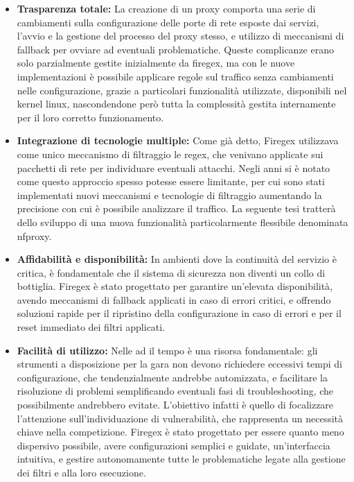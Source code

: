 \begin{itemize}
    \setlength{\itemsep}{1pt}
    \setlength{\parskip}{1pt}
    \item \textbf{Trasparenza totale:} La creazione di un proxy comporta una serie di cambiamenti sulla configurazione delle porte di rete esposte dai servizi, l'avvio e la gestione del processo del proxy stesso, e utilizzo di meccanismi di fallback per ovviare ad eventuali problematiche. Queste complicanze erano solo parzialmente gestite inizialmente da firegex, ma con le nuove implementazioni è possibile applicare regole sul traffico senza cambiamenti nelle configurazione, grazie a particolari funzionalità utilizzate, disponibili nel kernel linux, nascondendone però tutta la complessità gestita internamente per il loro corretto funzionamento.
    \item \textbf{Integrazione di tecnologie multiple:} Come già detto, Firegex utilizzava come unico meccanismo di filtraggio le \gls{regex}, che venivano applicate sui pacchetti di rete per individuare eventuali attacchi. Negli anni si è notato come questo approccio spesso potesse essere limitante, per cui sono stati implementati nuovi meccanismi e tecnologie di filtraggio aumentando la precisione con cui è possibile analizzare il traffico. La seguente tesi tratterà dello sviluppo di una nuova funzionalità particolarmente flessibile denominata \gls{nfproxy}.
    \item \textbf{Affidabilità e disponibilità:} In ambienti dove la continuità del servizio è critica, è fondamentale che il sistema di sicurezza non diventi un collo di bottiglia. Firegex è stato progettato per garantire un’elevata disponibilità, avendo meccanismi di fallback applicati in caso di errori critici, e offrendo soluzioni rapide per il ripristino della configurazione in caso di errori e per il reset immediato dei filtri applicati.
    \item \textbf{Facilità di utilizzo:} Nelle \gls{ad} il tempo è una risorsa fondamentale: gli strumenti a disposizione per la gara non devono richiedere eccessivi tempi di configurazione, che tendenzialmente andrebbe automizzata, e facilitare la risoluzione di problemi semplificando eventuali fasi di troubleshooting, che possibilmente andrebbero evitate. L'obiettivo infatti è quello di focalizzare l'attenzione sull'individuazione di vulnerabilità, che rappresenta un necessità chiave nella competizione. Firegex è stato progettato per essere quanto meno dispersivo possibile, avere configurazioni semplici e guidate, un'interfaccia intuitiva, e gestire autonomamente tutte le problematiche legate alla gestione dei filtri e alla loro esecuzione.
\end{itemize}

